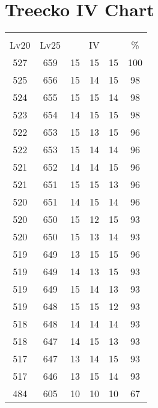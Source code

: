 \documentclass{article}%
\begin{document}
%
\normalsize%
\section{Treecko IV Chart}%
\label{sec:Treecko IV Chart}%
\renewcommand{\arraystretch}{1.5}%
\begin{tabular}{|c|c|c|c|c|c|}%
\hline%
\multicolumn{6}{|c|}{\textcolor{white}{ 
\linebreak{Treecko}
}%
\cellcolor{black}}\\%
\multicolumn{1}{|c}{Lv20}&\multicolumn{1}{c|}{Lv25}&\multicolumn{3}{c|}{IV}&\multicolumn{1}{|c|}{\%}\\%
\hline%
\rowcolor{color100}%
527&659&15&15&15&100\\%
\hline%
\rowcolor{color98}%
525&656&15&14&15&98\\%
\hline%
\rowcolor{color98}%
524&655&15&15&14&98\\%
\hline%
\rowcolor{color98}%
523&654&14&15&15&98\\%
\hline%
\rowcolor{color96}%
522&653&15&13&15&96\\%
\hline%
\rowcolor{color96}%
522&653&15&14&14&96\\%
\hline%
\rowcolor{color96}%
521&652&14&14&15&96\\%
\hline%
\rowcolor{color96}%
521&651&15&15&13&96\\%
\hline%
\rowcolor{color96}%
520&651&14&15&14&96\\%
\hline%
\rowcolor{color93}%
520&650&15&12&15&93\\%
\hline%
\rowcolor{color93}%
520&650&15&13&14&93\\%
\hline%
\rowcolor{color96}%
519&649&13&15&15&96\\%
\hline%
\rowcolor{color93}%
519&649&14&13&15&93\\%
\hline%
\rowcolor{color93}%
519&649&15&14&13&93\\%
\hline%
\rowcolor{color93}%
519&648&15&15&12&93\\%
\hline%
\rowcolor{color93}%
518&648&14&14&14&93\\%
\hline%
\rowcolor{color93}%
518&647&14&15&13&93\\%
\hline%
\rowcolor{color93}%
517&647&13&14&15&93\\%
\hline%
\rowcolor{color93}%
517&646&13&15&14&93\\%
\hline%
\rowcolor{color91}%
484&605&10&10&10&67\\%
\end{tabular}

%
\end{document}
